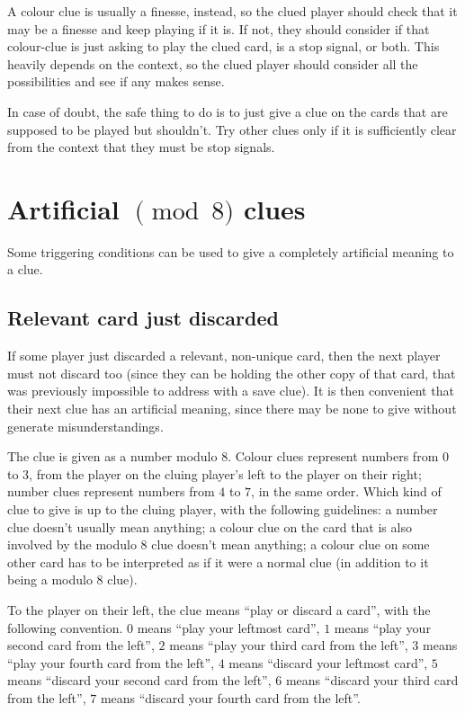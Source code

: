 \documentclass[a4paper]{article}
\theoremstyle{plain}
\theoremstyle{definition}
\begin{document}
A colour clue is usually a finesse, instead, so the clued player should check that it may be a finesse and keep playing if it is. If not, they should consider if that colour-clue is just asking to play the clued card, is a stop signal, or both. This heavily depends on the context, so the clued player should consider all the possibilities and see if any makes sense.

In case of doubt, the safe thing to do is to just give a clue on the cards that are supposed to be played but shouldn't. Try other clues only if it is sufficiently clear from the context that they must be stop signals.

\section{Artificial $\pmod 8$ clues}

Some triggering conditions can be used to give a completely artificial meaning to a clue.

\subsection{Relevant card just discarded}

If some player just discarded a relevant, non-unique card, then the next player must not discard too (since they can be holding the other copy of that card, that was previously impossible to address with a save clue). It is then convenient that their next clue has an artificial meaning, since there may be none to give without generate misunderstandings.

The clue is given as a number modulo 8. Colour clues represent numbers from $0$ to $3$, from the player on the cluing player's left to the player on their right; number clues represent numbers from $4$ to $7$, in the same order. Which kind of clue to give is up to the cluing player, with the following guidelines: a number clue doesn't usually mean anything; a colour clue on the card that is also involved by the modulo 8 clue doesn't mean anything; a colour clue on some other card has to be interpreted as if it were a normal clue (in addition to it being a modulo 8 clue).

To the player on their left, the clue means ``play or discard a card'', with the following convention. $0$ means ``play your leftmost card'', $1$ means ``play your second card from the left'', $2$ means ``play your third card from the left'', $3$ means ``play your fourth card from the left'', $4$ means ``discard your leftmost card'', $5$ means ``discard your second card from the left'', $6$ means ``discard your third card from the left'', $7$ means ``discard your fourth card from the left''.
\end{document}
